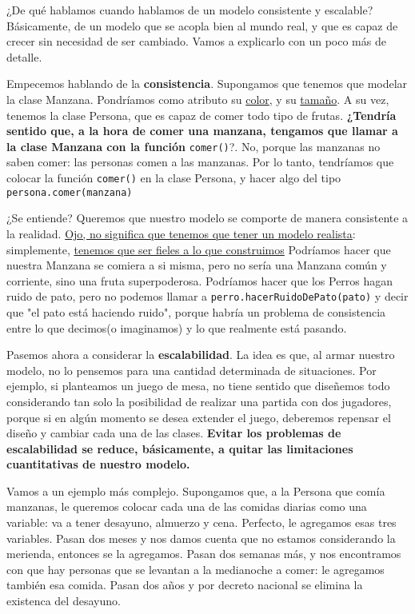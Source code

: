 \documentclass{article}
\begin{document}
¿De qué hablamos cuando hablamos de un modelo consistente y escalable? Básicamente, de un modelo que se acopla bien al mundo real, y que es capaz de crecer sin necesidad de ser cambiado. Vamos a explicarlo con un poco más de detalle.

Empecemos hablando de la \textbf{consistencia}. Supongamos que tenemos que modelar la clase Manzana. Pondríamos como atributo su \underline{color}, y su \underline{tamaño}. A su vez, tenemos la clase Persona, que es capaz de comer todo tipo de frutas. \textbf{¿Tendría sentido que, a la hora de comer una manzana, tengamos que llamar a la clase Manzana con la función} \verb|comer()|?. No, porque las manzanas no saben comer: las personas comen a las manzanas. Por lo tanto, tendríamos que colocar la función \verb|comer()| en la clase Persona, y hacer algo del tipo \verb|persona.comer(manzana)|

¿Se entiende? Queremos que nuestro modelo se comporte de manera consistente a la realidad. \underline{Ojo, no significa que tenemos que tener un modelo realista}: simplemente, \underline{tenemos que ser fieles a lo que construimos} Podríamos hacer que nuestra Manzana se comiera a si misma, pero no sería una Manzana común y corriente, sino una fruta superpoderosa. Podríamos hacer que los Perros hagan ruido de pato, pero no podemos llamar a \verb|perro.hacerRuidoDePato(pato)| y decir que "el pato está haciendo ruido", porque habría un problema de consistencia entre lo que decimos(o imaginamos) y lo que realmente está pasando.

Pasemos ahora a considerar la \textbf{escalabilidad}. La idea es que, al armar nuestro modelo, no lo pensemos para una cantidad determinada de situaciones. Por ejemplo, si planteamos un juego de mesa, no tiene sentido que diseñemos todo considerando tan solo la posibilidad de realizar una partida con dos jugadores, porque si en algún momento se desea extender el juego, deberemos repensar el diseño y cambiar cada una de las clases. \textbf{Evitar los problemas de escalabilidad se reduce, básicamente, a quitar las limitaciones cuantitativas de nuestro modelo.}

Vamos a un ejemplo más complejo. Supongamos que, a la Persona que comía manzanas, le queremos colocar cada una de las comidas diarias como una variable: va a tener desayuno, almuerzo y cena. Perfecto, le agregamos esas tres variables. Pasan dos meses y nos damos cuenta que no estamos considerando la merienda, entonces se la agregamos. Pasan dos semanas más, y nos encontramos con que hay personas que se levantan a la medianoche a comer: le agregamos también esa comida. Pasan dos años y por decreto nacional se elimina la existenca del desayuno. 
\end{document}
